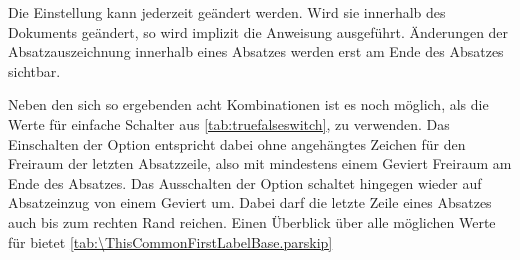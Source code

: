 Die Einstellung kann jederzeit geändert werden. Wird sie innerhalb des
Dokuments geändert, so wird implizit die Anweisung
%
ausgeführt. Änderungen der Absatzauszeichnung innerhalb eines Absatzes
werden erst am Ende des Absatzes sichtbar.

Neben den sich so ergebenden acht Kombinationen ist es noch möglich, als
 die Werte für einfache Schalter aus
\autoref{tab:truefalseswitch},  zu
verwenden. Das Einschalten der
Option entspricht
dabei  ohne angehängtes Zeichen für den Freiraum der letzten
Absatzzeile, also mit mindestens einem Geviert Freiraum am Ende des
Absatzes. Das Ausschalten der Option
schaltet hingegen wieder auf Absatzeinzug von einem Geviert um. Dabei darf die
letzte Zeile eines Absatzes auch bis zum rechten Rand reichen. Einen Überblick
über alle möglichen Werte für  bietet
\autoref{tab:\ThisCommonFirstLabelBase.parskip}%
